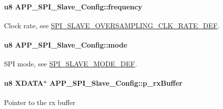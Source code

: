 \paragraph[{\texorpdfstring{frequency}{frequency}}]{\setlength{\rightskip}{0pt plus 5cm}u8 A\+P\+P\+\_\+\+S\+P\+I\+\_\+\+Slave\+\_\+\+Config\+::frequency}\hypertarget{struct_a_p_p___s_p_i___slave___config_adba7c45b165b8aa739010b156bb471c5}{}\label{struct_a_p_p___s_p_i___slave___config_adba7c45b165b8aa739010b156bb471c5}
Clock rate, see \hyperlink{group___s_p_i___s_l_a_v_e_ga829f1873bfb32bd5f6a679d3f4dd3979}{S\+P\+I\+\_\+\+S\+L\+A\+V\+E\+\_\+\+O\+V\+E\+R\+S\+A\+M\+P\+L\+I\+N\+G\+\_\+\+C\+L\+K\+\_\+\+R\+A\+T\+E\+\_\+\+D\+EF}. 
\paragraph[{\texorpdfstring{mode}{mode}}]{\setlength{\rightskip}{0pt plus 5cm}u8 A\+P\+P\+\_\+\+S\+P\+I\+\_\+\+Slave\+\_\+\+Config\+::mode}\hypertarget{struct_a_p_p___s_p_i___slave___config_ab08cda8990f31dd79e07c36108532523}{}\label{struct_a_p_p___s_p_i___slave___config_ab08cda8990f31dd79e07c36108532523}
S\+PI mode, see \hyperlink{group___s_p_i___s_l_a_v_e_ga8cb12470ae37e3883289b52731634acc}{S\+P\+I\+\_\+\+S\+L\+A\+V\+E\+\_\+\+M\+O\+D\+E\+\_\+\+D\+EF}. 
\paragraph[{\texorpdfstring{p\+\_\+rx\+Buffer}{p_rxBuffer}}]{\setlength{\rightskip}{0pt plus 5cm}u8 X\+D\+A\+TA$\ast$ A\+P\+P\+\_\+\+S\+P\+I\+\_\+\+Slave\+\_\+\+Config\+::p\+\_\+rx\+Buffer}\hypertarget{struct_a_p_p___s_p_i___slave___config_a1b90cf577f94dbf0c0b1d117fef45c6a}{}\label{struct_a_p_p___s_p_i___slave___config_a1b90cf577f94dbf0c0b1d117fef45c6a}
Pointer to the rx buffer 
